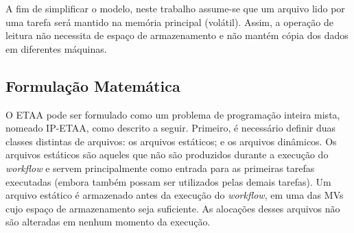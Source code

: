 A fim de simplificar o modelo, neste trabalho assume-se que um arquivo lido por uma tarefa será mantido na memória principal (volátil). Assim, a operação de leitura não necessita de espaço de armazenamento e não mantém cópia dos dados em diferentes máquinas. 


    

\subsection{Formulação Matemática}\label{math_form}

O ETAA pode ser formulado como um problema de programação inteira mista, nomeado IP-ETAA, como descrito a seguir. Primeiro, é necessário definir duas classes distintas de arquivos: os arquivos estáticos; e os arquivos dinâmicos. Os arquivos estáticos são aqueles que não são produzidos durante a execução do \textit{workflow} e servem principalmente como entrada para as primeiras tarefas executadas (embora também possam ser utilizados pelas demais tarefas). Um arquivo estático é armazenado antes da execução do \textit{workflow}, em uma das MVs cujo espaço de armazenamento seja suficiente. As alocações desses arquivos não são alteradas em nenhum momento da execução.

